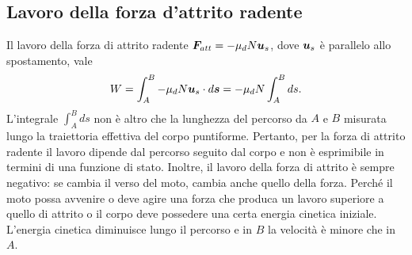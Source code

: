 \subsection{Lavoro della forza d'attrito radente}
Il lavoro della forza di attrito radente $\bm{F}_{att}=-\mu_dN\bm{u}_s$, dove $\bm{u}_s$ è parallelo allo spostamento, vale
\begin{equation}
    W=\int_A^B-\mu_dN\bm{u}_s\cdot d\bm{s}=-\mu_dN\int_A^Bds.
\end{equation}
L'integrale $\int_A^Bds$ non è altro che la lunghezza del percorso da $A$ e $B$ misurata lungo la traiettoria effettiva del corpo puntiforme. Pertanto, per la forza di attrito radente il lavoro dipende dal percorso seguito dal corpo e non è esprimibile in termini di una funzione di stato. Inoltre, il lavoro della forza di attrito è sempre negativo: se cambia il verso del moto, cambia anche quello della forza. Perché il moto possa avvenire o deve agire una forza che produca un lavoro superiore a quello di attrito o il corpo deve possedere una certa energia cinetica iniziale. L'energia cinetica diminuisce lungo il percorso e in $B$ la velocità è minore che in $A$. 

